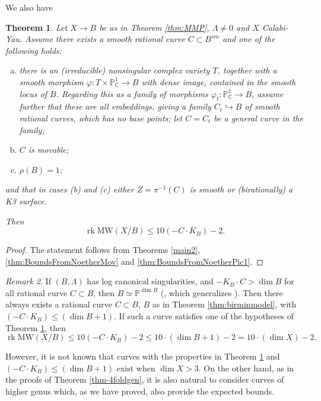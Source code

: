 \documentclass[11pt]{amsart}
\newtheorem{theorem}{Theorem}[section]
\theoremstyle{definition}
\theoremstyle{definition}
\theoremstyle{remark}
\newtheorem{remark}[theorem]{Remark}
\theoremstyle{remark}
\theoremstyle{definition}
\theoremstyle{conjecture}
\newcommand{\MW}{\mathrm{MW}}
\begin{document}
   We also have
 \begin{theorem}\label{thm:boundsCYanyDimCRational} Let  $ X \to B$ be as in Theorem \ref{thm:MMP}, $\Lambda \neq 0$ and $X$ Calabi-Yau. 
Assume there exists a  smooth rational curve $C \subset B^{sm}$ and one  of the following holds:
\begin{enumerate}[(a)] 
\item  there is an (irreducible) nonsingular complex variety $T$,
together with a smooth morphism
$\varphi:T\times{\mathbb P}^1_{\mathbb C}\to B$ with dense image,
contained in the smooth locus of $B$.
Regarding this as a family of morphisms $\varphi_t:{\mathbb P}^1_{\mathbb C}\to B$,
assume further that these are all embeddings,
giving a family $C_t\hookrightarrow B$ of smooth rational curves, which has no base points; let $C=C_t$ be a general curve in the family;
\item $C$ is movable;   %
\item $\rho(B)=1$;\end{enumerate}
and  that  in cases  (b) and (c) either  $Z = \pi^{-1}(C)$ is   smooth or (birationally) a K3 surface.

Then
	\[
	\operatorname{rk} \MW(X/B) \leq 10 (- C  \cdot K_B)  -2 .
	\]
	
\end{theorem}
 
\begin{proof}  The statement follows from  Theorems \ref{main2}, \ref{thm:BoundsFromNoetherMov} and \ref{thm:BoundsFromNoetherPic1}. \end{proof}
\begin{remark}\label{remark:CharPN} If $(B, \Lambda)$ has log canonical singularities,  and  ${-K_B \cdot C > \dim B}$ for all rational curve $C \subset B$, then $B \simeq \mathbb{P}^{\dim B}$ (\cite{fujino2026CharacterizationProjectiveSpaceLengths}, which generalizes \cite{ChoMiyaokaSheperd-Barron2003}).   Then  there always exists a rational curve $C\subset B $, $B$ as in Theorem \ref{thm:birminmodel}, with  $(- C  \cdot K_B) \leq (\dim B+1)$. 
If such a curve satisfies one of the hypotheses of  Theorem \ref{thm:boundsCYanyDimCRational}, then
\begin{equation}\label{eq:boundsdim}
	\operatorname{rk} \MW(X/B) \leq 10 (- C  \cdot K_B)  -2 \le 10 \cdot (\dim B+1)  -2 = 10 \cdot  (\dim X)  -2 .  
\end{equation}
\end{remark}

However, it is not known that  curves with the properties in Theorem \ref{thm:boundsCYanyDimCRational} and  $(- C  \cdot K_B) \leq (\dim B+1)$  exist when $\dim X >3$. On the other hand, as in the proofs of Theorem \ref{thm-4foldgen}, it is also natural to consider curves of higher genus which, as we have proved,  also provide the expected bounds.
\end{document}
